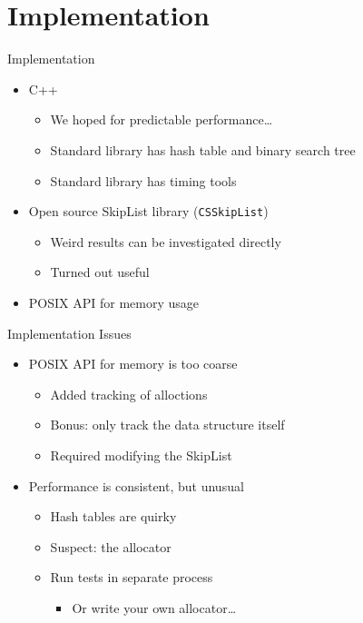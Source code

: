 \documentclass[10pt]{beamer}
\begin{document}
\section{Implementation}
\begin{frame}{Implementation}
    \begin{itemize}
        \item C++
        \begin{itemize}
            \item We hoped for predictable performance\ldots
            \item Standard library has hash table and binary search tree
            \item Standard library has timing tools
        \end{itemize}
        \item Open source SkipList library (\texttt{CSSkipList})
        \begin{itemize}
            \item Weird results can be investigated directly
            \item Turned out useful
        \end{itemize}
        \item POSIX API for memory usage
    \end{itemize}
\end{frame}

\begin{frame}{Implementation Issues}
    \begin{itemize}
        \item POSIX API for memory is too coarse
        \begin{itemize}
            \item Added tracking of alloctions
            \item Bonus: only track the data structure itself
            \item Required modifying the SkipList
        \end{itemize}
        \item Performance is consistent, but unusual
        \begin{itemize}
            \item Hash tables are quirky
            \item Suspect: the allocator
            \item Run tests in separate process
            \begin{itemize}
                \item Or write your own allocator\ldots
            \end{itemize}
        \end{itemize}
    \end{itemize}
\end{frame}
\end{document}
